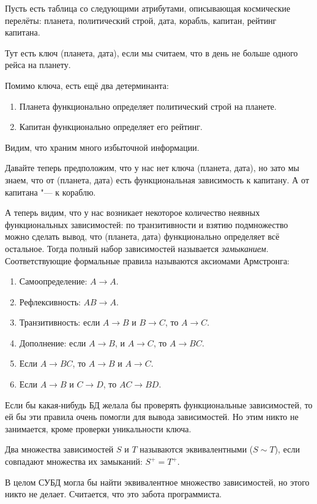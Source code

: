 	\begin{exmp}
		Пусть есть таблица со следующими атрибутами, описывающая космические перелёты:
		планета, политический строй, дата, корабль, капитан, рейтинг капитана.

		Тут есть ключ (планета, дата), если мы считаем, что в день не больше одного рейса на планету.

		Помимо ключа, есть ещё два детерминанта:
		\begin{enumerate}
			\item Планета функционально определяет политический строй на планете.
			\item Капитан функционально определяет его рейтинг.
		\end{enumerate}
	\end{exmp}
	Видим, что храним много избыточной информации.

	Давайте теперь предположим, что у нас нет ключа (планета, дата), но зато мы знаем,
	что от (планета, дата) есть функциональная зависимость к капитану.
	А от капитана "--- к кораблю.

	А теперь видим, что у нас возникает некоторое количество неявных функциональных зависимостей:
	по транзитивности и взятию подмножество можно сделать вывод, что (планета, дата) функционально
	определяет всё остальное.
	Тогда полный набор зависимостей называется \textit{замыканием}.
	Соответствующие формальные правила называются аксиомами Армстронга:
	\begin{enumerate}
		\item Самоопределение: $A \to A$.
		\item Рефлексивность: $AB \to A$.
		\item Транзитивность: если $A \to B$ и $B \to C$, то $A \to C$.
		\item Дополнение: если $A \to B$, и $A \to C$, то $A \to BC$.
		\item Если $A \to BC$, то $A \to B$ и $A \to C$.
		\item Если $A \to B$ и $C \to D$, то $AC \to BD$.
	\end{enumerate}

	Если бы какая-нибудь БД желала бы проверять функциональные зависимостей, то ей
	бы эти правила очень помогли для вывода зависимостей.
	Но этим никто не занимается, кроме проверки уникальности ключа.
	\begin{Def}
		Два множества зависимостей $S$ и $T$ называются эквивалентными ($S \sim T$),
		если совпадают множества их замыканий: $S^{+} = T^{+}$.
	\end{Def}
	В целом СУБД могла бы найти эквивалентное множество зависимостей, но этого никто не делает.
	Считается, что это забота программиста.

